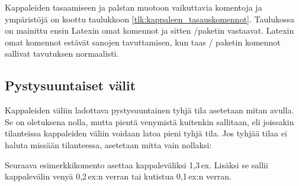 
Kappaleiden tasaamiseen ja palstan muotoon vaikuttavia komentoja ja
ympäristöjä on koottu taulukkoon \ref{tlk:kappaleen_tasauskomennot}.
Taulukossa on mainittu ensin Latexin omat komennot ja sitten
\-/paketin vastaavat. Latexin omat
komennot estävät sanojen tavuttamisen, kun taas \-/
paketin komennot sallivat tavutuksen normaalisti.

\subsection{Pystysuuntaiset välit}
\label{luku:pystysuuntaiset_valit}

Kappaleiden väliin ladottava pystysuuntainen tyhjä tila asetetaan mitan
 avulla. Se on oletuksena nolla, mutta pientä venymistä
kuitenkin sallitaan, eli joissakin tilanteissa kappaleiden väliin
voidaan latoa pieni tyhjä tila. Jos tyhjää tilaa ei haluta missään
tilanteessa, asetetaan mitta vain nollaksi:

\begin{koodilohkosis}
\setlength{\parskip}{0ex}
\end{koodilohkosis}

Seuraava esimerkkikomento asettaa kappaleväliksi 1,3\,ex. Lisäksi se
sallii kappalevälin venyä 0,2\,ex:n verran tai kutistua 0,1\,ex:n
verran.

